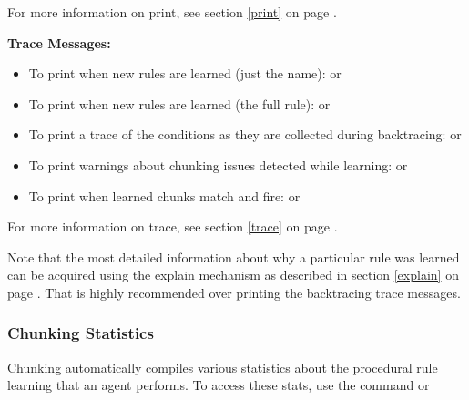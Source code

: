 For more information on print, see section \ref{print} on page \pageref{print}.

\textbf{Trace Messages:}
\begin{itemize}
	\item To print when new rules are learned (just the name): \newline {} or  
	\item To print when new rules are learned (the full rule): \newline {} or  
	\item To print a trace of the conditions as they are collected during backtracing: \newline {} or  
	\item To print warnings about chunking issues detected while learning:  \newline {} or 
	\item To print when learned chunks match and fire: \newline  {} or  
\end{itemize}
For more information on trace, see section \ref{trace} on page \pageref{trace}.

Note that the most detailed information about why a particular rule was learned can be acquired using the explain mechanism as described in section \ref{explain} on page \pageref{explain}.  That is highly recommended over printing the backtracing trace messages.

\subsubsection{Chunking Statistics}

Chunking automatically compiles various statistics about the procedural rule learning that an agent performs.  To access these stats, use the command  or 

